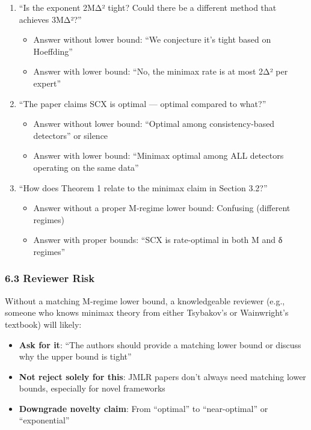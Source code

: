 \documentclass[
  12pt,
]{article}
\providecommand{\tightlist}{%
  \setlength{\itemsep}{0pt}\setlength{\parskip}{0pt}}
\begin{document}
\begin{enumerate}
\def\labelenumi{\arabic{enumi}.}
\tightlist
\item
  ``Is the exponent 2MΔ² tight? Could there be a different method that
  achieves 3MΔ²?''

  \begin{itemize}
  \tightlist
  \item
    Answer without lower bound: ``We conjecture it's tight based on
    Hoeffding''
  \item
    Answer with lower bound: ``No, the minimax rate is at most 2Δ² per
    expert''
  \end{itemize}
\item
  ``The paper claims SCX is optimal --- optimal compared to what?''

  \begin{itemize}
  \tightlist
  \item
    Answer without lower bound: ``Optimal among consistency-based
    detectors'' or silence
  \item
    Answer with lower bound: ``Minimax optimal among ALL detectors
    operating on the same data''
  \end{itemize}
\item
  ``How does Theorem 1 relate to the minimax claim in Section 3.2?''

  \begin{itemize}
  \tightlist
  \item
    Answer without a proper M-regime lower bound: Confusing (different
    regimes)
  \item
    Answer with proper bounds: ``SCX is rate-optimal in both M and δ
    regimes''
  \end{itemize}
\end{enumerate}

\subsubsection{6.3 Reviewer Risk}\label{reviewer-risk}

Without a matching M-regime lower bound, a knowledgeable reviewer (e.g.,
someone who knows minimax theory from either Tsybakov's or Wainwright's
textbook) will likely:

\begin{itemize}
\tightlist
\item
  \textbf{Ask for it}: ``The authors should provide a matching lower
  bound or discuss why the upper bound is tight''
\item
  \textbf{Not reject solely for this}: JMLR papers don't always need
  matching lower bounds, especially for novel frameworks
\item
  \textbf{Downgrade novelty claim}: From ``optimal'' to ``near-optimal''
  or ``exponential''
\end{itemize}
\end{document}
